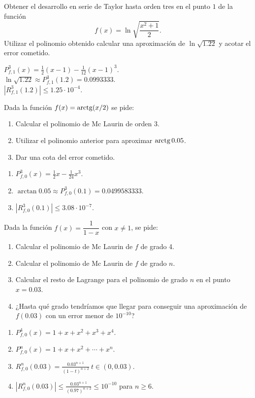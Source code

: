 {Obtener el desarrollo en serie de Taylor hasta orden tres en el punto $1$ de la función 
\[f(x) = \ln\sqrt{\dfrac{x^2+1}{2}}.\]
Utilizar el polinomio obtenido calcular una aproximación de $\ln\sqrt{1.22}$ y acotar el error cometido.
}
{$P^3_{f,1}(x) = \frac{1}{2}(x-1)-\frac{1}{12}(x-1)^3$.\\
$\ln\sqrt{1.22} \approx P^3_{f,1}(1.2) = 0.0993333$.\\
$|R^3_{f,1}(1.2)|\leq 1.25\cdot 10^{-4}$.

}
{
}


{Dada la función $f(x)=\operatorname{arctg}(x/2)$ se pide:
\begin{enumerate}
\item Calcular el polinomio de Mc Laurin de orden 3.
\item Utilizar el polinomio anterior para aproximar $\operatorname{arctg} 0.05$.
\item Dar una cota del error cometido.
\end{enumerate}
}
{\begin{enumerate}
\item $P^3_{f,0}(x) =  \frac{1}{2}x-\frac{1}{24}x^3$.
\item $\arctan 0.05 \approx P^3_{f,0}(0.1) = 0.0499583333$.
\item $|R^3_{f,0}(0.1)|\leq 3.08\cdot 10^{-7}$.
\end{enumerate}
}
{
}


{Dada la función $f(x)=\dfrac{1}{1-x}$ con $x\neq 1$, se pide:
\begin{enumerate}
\item Calcular el polinomio de Mc Laurin de $f$ de grado 4.
\item Calcular el polinomio de Mc Laurin de $f$ de grado $n$.
\item Calcular el resto de Lagrange para el polinomio de grado $n$ en el punto $x=0.03$.
\item ¿Hasta qué grado tendríamos que llegar para conseguir una aproximación de $f(0.03)$ con un error menor de $10^{-10}$?
\end{enumerate}
}
{\begin{enumerate}
\item $P^4_{f,0}(x) = 1 + x + x^2 + x^3 + x^4$.
\item $P^n_{f,0}(x) = 1 + x + x^2 + \cdots + x^n$.
\item $R^n_{f,0}(0.03) = \frac{0.03^{n+1}}{(1-t)^{n+2}} \ t\in(0,0.03)$.
\item $|R^n_{f,0}(0.03)| \leq \frac{0.03^{n+1}}{(0.97)^{n+2}}\leq 10^{-10}$ para $n\geq 6$.
\end{enumerate}
}
{
}


